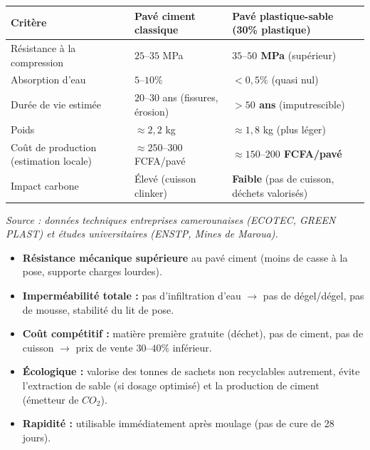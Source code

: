 \documentclass[11pt]{article}
\begin{document}
\begin{exemplebox}
\begin{center}
\begin{tabularx}{\linewidth}{|l|X|X|}\hline
\rowcolor{popblueL} \textbf{Critère} & \textbf{Pavé ciment classique} & \textbf{Pavé plastique-sable (30\% plastique)} \\ \hline
Résistance à la compression & $25\text{--}35$ MPa & \textbf{$35\text{--}50$ MPa} (supérieur) \\ \hline
Absorption d'eau & $5\text{--}10\%$ & \textbf{$< 0,5\%$} (quasi nul) \\ \hline
Durée de vie estimée & $20\text{--}30$ ans (fissures, érosion) & \textbf{$> 50$ ans} (imputrescible) \\ \hline
Poids & $\approx 2,2$ kg & $\approx 1,8$ kg (plus léger) \\ \hline
Coût de production (estimation locale) & $\approx 250\text{--}300$ FCFA/pavé & \textbf{$\approx 150\text{--}200$ FCFA/pavé} \\ \hline
Impact carbone & Élevé (cuisson clinker) & \textbf{Faible} (pas de cuisson, déchets valorisés) \\ \hline
\end{tabularx}
\end{center}
\emph{Source : données techniques entreprises camerounaises (ECOTEC, GREEN PLAST) et études universitaires (ENSTP, Mines de Maroua).}
\end{exemplebox}

\begin{aretenir}
\begin{itemize}
    \item \textbf{Résistance mécanique supérieure} au pavé ciment (moins de casse à la pose, supporte charges lourdes).
    \item \textbf{Imperméabilité totale :} pas d'infiltration d'eau $\rightarrow$ pas de dégel/dégel, pas de mousse, stabilité du lit de pose.
    \item \textbf{Coût compétitif :} matière première gratuite (déchet), pas de ciment, pas de cuisson $\rightarrow$ prix de vente $30\text{--}40\%$ inférieur.
    \item \textbf{Écologique :} valorise des tonnes de sachets non recyclables autrement, évite l'extraction de sable (si dosage optimisé) et la production de ciment (émetteur de $CO_2$).
    \item \textbf{Rapidité :} utilisable immédiatement après moulage (pas de cure de 28 jours).
\end{itemize}
\end{aretenir}
\end{document}
